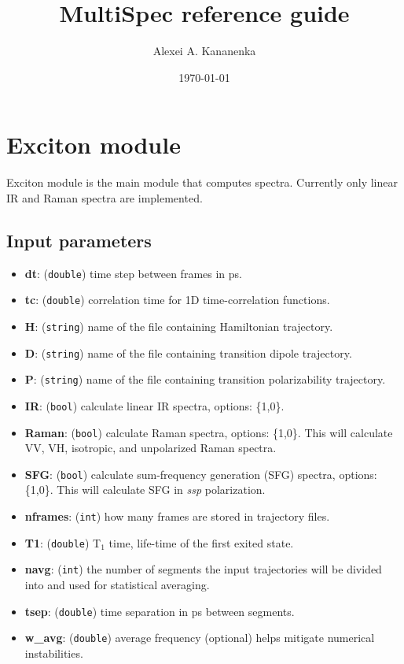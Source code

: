 \documentclass{article}
\begin{document}
\title{MultiSpec reference guide}
\author{Alexei A. Kananenka}
\date{\today}
\maketitle
\tableofcontents

\section{Exciton module}
Exciton module is the main module that computes spectra. Currently only linear IR and Raman spectra are implemented.

\subsection{Input parameters}

\begin{itemize}
\item \textbf{dt}: (\texttt{double}) time step between frames in ps.
\item \textbf{tc}: (\texttt{double}) correlation time for 1D time-correlation functions.
\item \textbf{H}: (\texttt{string}) name of the file containing Hamiltonian trajectory. 
\item \textbf{D}: (\texttt{string}) name of the file containing transition dipole trajectory. 
\item \textbf{P}: (\texttt{string}) name of the file containing transition polarizability trajectory. 
\item \textbf{IR}: (\texttt{bool}) calculate linear IR spectra, options: \{1,0\}.
\item \textbf{Raman}: (\texttt{bool}) calculate Raman spectra, options: \{1,0\}. This will calculate VV, VH, isotropic, and unpolarized Raman spectra.
\item \textbf{SFG}: (\texttt{bool}) calculate sum-frequency generation (SFG) spectra, options: \{1,0\}. This will calculate SFG in \textit{ssp} polarization.
\item \textbf{nframes}: (\texttt{int}) how many frames are stored in trajectory files.
\item \textbf{T1}: (\texttt{double}) T$_1$ time, life-time of the first exited state.
\item \textbf{navg}: (\texttt{int}) the number of segments the input trajectories will be divided into and used for statistical averaging.
\item \textbf{tsep}: (\texttt{double}) time separation in ps between segments.
\item \textbf{w\_avg}: (\texttt{double}) average frequency (optional) helps mitigate numerical instabilities.

\end{itemize}
\end{document}
